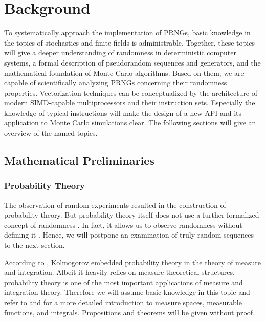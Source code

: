 \documentclass{stdlocal}
\begin{document}
\section{Background} %
\label{sec:background}
  To systematically approach the implementation of PRNGs, basic knowledge in the topics of stochastics and finite fields is administrable.
  Together, these topics will give a deeper understanding of randomness in deterministic computer systems, a formal description of pseudorandom sequences and generators, and the mathematical foundation of Monte Carlo algorithms.
  Based on them, we are capable of scientifically analyzing PRNGs concerning their randomness properties.
  Vectorization techniques can be conceptualized by the architecture of modern SIMD-capable multiprocessors and their instruction sets.
  Especially the knowledge of typical instructions will make the design of a new API and its application to Monte Carlo simulations clear.
  The following sections will give an overview of the named topics.

  \subsection{Mathematical Preliminaries} %
  \label{sub:mathematical_preliminaries}
    \subsubsection{Probability Theory} %
    \label{ssub:stochastics}
      The observation of random experiments resulted in the construction of probability theory.
      But probability theory itself does not use a further formalized concept of randomness \autocite{schmidt2009}.
      In fact, it allows us to observe randomness without defining it \autocite{volchan2002}.
      Hence, we will postpone an examination of truly random sequences to the next section.

      According to \textcite{schmidt2009}, Kolmogorov embedded probability theory in the theory of measure and integration.
      Albeit it heavily relies on measure-theoretical structures, probability theory is one of the most important applications of measure and integration theory.
      Therefore we will assume basic knowledge in this topic and refer to \textcite{schmidt2009} and \textcite{elstrodt2011} for a more detailed introduction to measure spaces, measurable functions, and integrals.
      Propositions and theorems will be given without proof.
\end{document}
